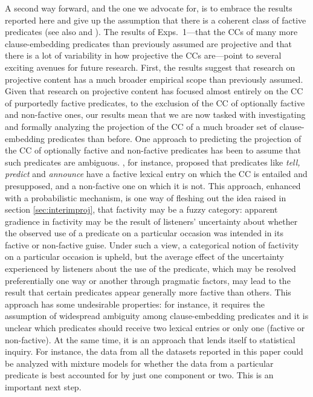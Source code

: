 \documentclass[11pt,fleqn]{article}
\newcommand{\6}{\mbox{$[\hspace*{-.6mm}[$}}
\newcommand{\9}{\mbox{$]\hspace*{-.6mm}]$}}
\begin{document}
A second way forward, and the one we advocate for, is to embrace the results reported here and give up the assumption that there is a coherent class of factive predicates (see also \citealt{karttunen2016} and \citealt{djaerv-thesis}). The results of Exps.~1---that the CCs of many more clause-embedding predicates than previously assumed are projective and that there is a lot of variability in how projective the CCs are---point to several exciting avenues for future research. First, the results suggest that research on projective content has a much broader empirical scope than previously assumed. Given that research on projective content has focused almost entirely on the CC of purportedly factive predicates, to the exclusion of the CC of optionally factive and non-factive ones, our results mean that we are now tasked with investigating and formally analyzing the projection of the CC of a much broader set of clause-embedding predicates than before. One approach to predicting the projection of the CC of optionally factive and non-factive predicates has been to assume that such predicates are ambiguous. \citet[1736]{spector-egre2015}, for instance, proposed that predicates like {\em tell, predict} and {\em announce}  have a factive lexical entry on which the CC is entailed and presupposed, and a non-factive one on which it is not. This approach, enhanced with a probabilistic mechanism, is one way of fleshing out the idea raised in section \ref{sec:interimproj}, that factivity may be a fuzzy category: apparent gradience in factivity may be the result of listeners' uncertainty about whether the observed use of a predicate on a particular occasion was intended in its factive or non-factive guise. Under such a view, a categorical notion of factivity on a particular occasion is upheld, but the average effect of the uncertainty experienced by listeners about the use of the predicate, which may be resolved preferentially one way or another through pragmatic factors, may lead to the result that certain predicates appear generally more factive than others.  This approach has some undesirable properties: for instance, it requires the assumption of widespread ambiguity among clause-embedding predicates and it is unclear which predicates should receive two lexical entries or only one (factive or non-factive). At the same time, it is an approach that lends itself to statistical inquiry. For instance, the data from all the datasets reported in this paper could be analyzed with mixture models for whether the data from a particular predicate is best accounted for by just one component or two. This is an important next step. 
\end{document}
